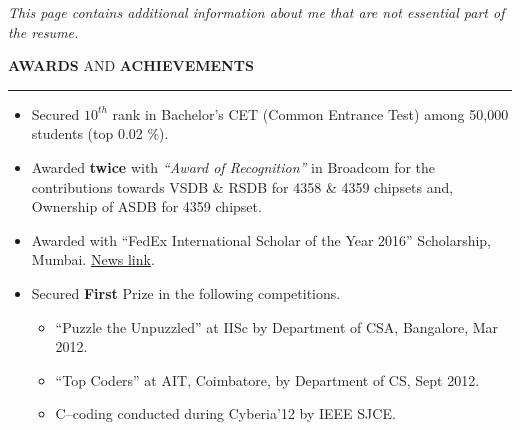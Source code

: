\documentclass[a4paper, 10pt]{extarticle}
\begin{document}
\begin{large}
\begin{center}
 \large{\textit{This page contains additional information about me that are not
essential part of the resume.}}
\end{center}
\vspace{.2cm}
\begin{flushleft}
{\LARGE{\textbf{A}}\Large{\textbf{WARDS}} \large{AND}
\LARGE{\textbf{A}}\Large{\textbf{CHIEVEMENTS}}}
\end{flushleft}
\vspace{-.2cm} \hrule \vspace{-.1cm}
\begin{itemize}
    \item{Secured $10^{th}$ rank in Bachelor's CET (Common Entrance Test) among
50,000 students (top 0.02 \%).}
    \vspace{-.1cm}
    
    \item{Awarded \textbf{twice} with \textit{``Award of Recognition''} in
Broadcom for the contributions towards VSDB \& RSDB for 4358 \& 4359 chipsets
and, Ownership of ASDB for 4359 chipset.}
    \vspace{-.1cm}
    
    \item{Awarded with ``FedEx International Scholar of the Year 2016''
Scholarship, Mumbai.
\href{https://www.linkedin.com/pulse/bangalore-student-wins-fedex-scholarship-edu-beanz}{News
link}.}
    \vspace{-.1cm}
    
    \item{Secured \textbf{First} Prize in the following competitions.
        \vspace{-.2cm}
        \begin{itemize}
            \item{``Puzzle the Unpuzzled'' at IISc by Department of CSA,
Bangalore, Mar 2012.}
            
            \item{``Top Coders'' at AIT, Coimbatore, by Department of CS, Sept
2012.}
            
            \item{C--coding conducted during Cyberia'12 by IEEE SJCE.}
            

\end{itemize}}
\end{itemize}
\end{large}
\end{document}
